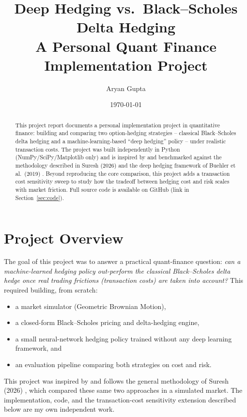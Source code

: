 \documentclass[11pt]{article}
\title{\textbf{Deep Hedging vs.\ Black--Scholes Delta Hedging} \\[4pt]
\large A Personal Quant Finance Implementation Project}
\author[1]{Aryan Gupta}
\affil[1]{Personal Project}
\date{\today}
\begin{document}
\maketitle
\thispagestyle{fancy}

\begin{abstract}
\noindent
This project report documents a personal implementation project in
quantitative finance: building and comparing two option-hedging
strategies -- classical Black--Scholes delta hedging and a
machine-learning-based ``deep hedging'' policy -- under realistic
transaction costs. The project was built independently in Python
(NumPy/SciPy/Matplotlib only) and is inspired by and benchmarked against
the methodology described in Suresh (2026) \cite{suresh2026} and the
deep hedging framework of Buehler et al.\ (2019) \cite{buehler2019}.
Beyond reproducing the core comparison, this project adds a transaction
cost sensitivity sweep to study how the tradeoff between hedging cost and
risk scales with market friction. Full source code is available on
GitHub (link in Section~\ref{sec:code}).
\end{abstract}

\vspace{0.3cm}

\section{Project Overview}
The goal of this project was to answer a practical quant-finance
question: \emph{can a machine-learned hedging policy out-perform the
classical Black--Scholes delta hedge once real trading frictions
(transaction costs) are taken into account?} This required building,
from scratch:

\begin{itemize}[nosep, leftmargin=1.5em]
    \item a market simulator (Geometric Brownian Motion),
    \item a closed-form Black--Scholes pricing and delta-hedging engine,
    \item a small neural-network hedging policy trained without any deep
    learning framework, and
    \item an evaluation pipeline comparing both strategies on cost and
    risk.
\end{itemize}

This project was inspired by and follows the general methodology of
Suresh (2026) \cite{suresh2026}, which compared these same two approaches
in a simulated market. The implementation, code, and the transaction-cost
sensitivity extension described below are my own independent work.
\end{document}
